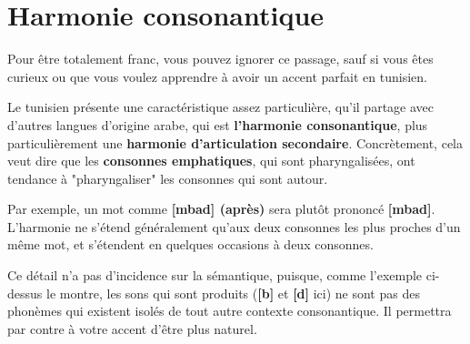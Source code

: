 \section{Harmonie consonantique}
Pour être totalement franc, vous pouvez ignorer ce passage, sauf si vous êtes curieux ou que vous voulez apprendre à avoir un accent parfait en tunisien. 

Le tunisien présente une caractéristique assez particulière, qu'il partage avec d'autres langues d'origine arabe, qui est \textbf{l'harmonie consonantique}, plus particulièrement une \textbf{harmonie d'articulation secondaire}. Concrètement, cela veut dire que les \textbf{consonnes emphatiques}, qui sont pharyngalisées, ont tendance à "pharyngaliser" les consonnes qui sont autour. 

Par exemple, un mot comme \textbf{[mba\textrevglotstop \textschwa d] (après)} sera plutôt prononcé \textbf{[mb\super\textrevglotstop a\textrevglotstop \textschwa d\super\textrevglotstop]}. L'harmonie ne s'étend généralement qu'aux deux consonnes les plus proches d'un même mot, et s'étendent en quelques occasions à deux consonnes.

Ce détail n'a pas d'incidence sur la sémantique, puisque, comme l'exemple ci-dessus le montre, les sons qui sont produits (\textbf{[b\super\textrevglotstop]} et \textbf{[d\super\textrevglotstop]} ici) ne sont pas des phonèmes qui existent isolés de tout autre contexte consonantique. Il permettra par contre à votre accent d'être plus naturel.
